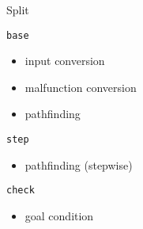 \begin{frame}{Split}
    \begin{minipage}{0.5\textwidth}
        \begin{tcolorbox}[colframe=black, colback=white, sharp corners=southwest, boxrule=0.5mm]
            \texttt{base}
            \begin{itemize}
                \item input conversion
                \item malfunction conversion
                \item pathfinding
            \end{itemize}
        \end{tcolorbox}
    \end{minipage}%
    \begin{minipage}{0.5\textwidth}
        \begin{tcolorbox}[colframe=black, colback=white, sharp corners=northwest, boxrule=0.5mm]
            \texttt{step}
            \begin{itemize}
                \item pathfinding (stepwise)
            \end{itemize}
        \end{tcolorbox}
        \vspace{0.5cm} %
        \begin{tcolorbox}[colframe=black, colback=white, sharp corners=southeast, boxrule=0.5mm]
            \texttt{check}
            \begin{itemize}
                \item goal condition
            \end{itemize}
        \end{tcolorbox}
    \end{minipage}
\end{frame}